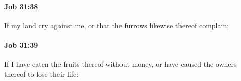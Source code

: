 		\paragraph{Job 31:38} %
			\label{JOB-31-38}

			If my land cry against me, or that the furrows likewise thereof complain;


		\paragraph{Job 31:39} %
			\label{JOB-31-39}

			If I have eaten the fruits thereof without money, or have caused the owners thereof to lose their life:


